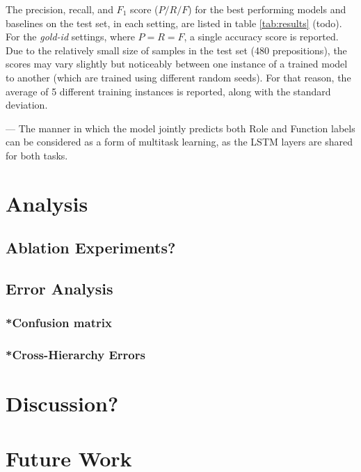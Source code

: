 The precision, recall, and $F_1$ score ($P/R/F$) for the best performing models and baselines on the test set, in each setting, are listed in table \ref{tab:results} (todo). For the \textit{gold-id} settings, where $P = R = F$, a single accuracy score is reported. Due to the relatively small size of samples in the test set (480 prepositions), the scores may vary slightly but noticeably between one instance of a trained model to another (which are trained using different random seeds). For that reason, the average of 5 different training instances is reported, along with the standard deviation.



---
The manner in which the model jointly predicts both Role and Function labels can be considered as a form of multitask learning, as the LSTM layers are shared for both tasks. 

\section{Analysis} \label{sec:pssanalysis}
\subsection{Ablation Experiments?}
\subsection{Error Analysis}
\subsubsection{*Confusion matrix}
\subsubsection{*Cross-Hierarchy Errors}

\section{Discussion?}

\section{Future Work}

